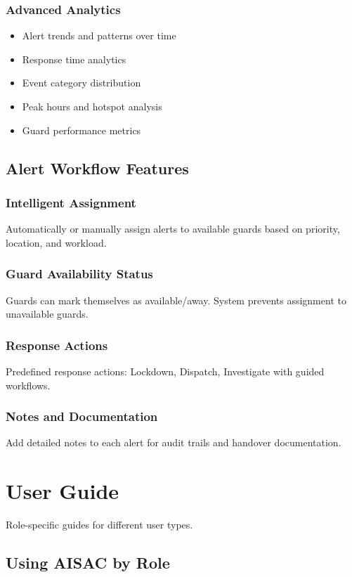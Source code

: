 \documentclass[12pt,a4paper]{article}
\begin{document}
\subsubsection{Advanced Analytics}
\begin{itemize}
\item Alert trends and patterns over time
\item Response time analytics
\item Event category distribution
\item Peak hours and hotspot analysis
\item Guard performance metrics
\end{itemize}

\subsection{Alert Workflow Features}

\subsubsection{Intelligent Assignment}
Automatically or manually assign alerts to available guards based on priority, location, and workload.

\subsubsection{Guard Availability Status}
Guards can mark themselves as available/away. System prevents assignment to unavailable guards.

\subsubsection{Response Actions}
Predefined response actions: Lockdown, Dispatch, Investigate with guided workflows.

\subsubsection{Notes and Documentation}
Add detailed notes to each alert for audit trails and handover documentation.

\section{User Guide}

Role-specific guides for different user types.

\subsection{Using AISAC by Role}
\end{document}
